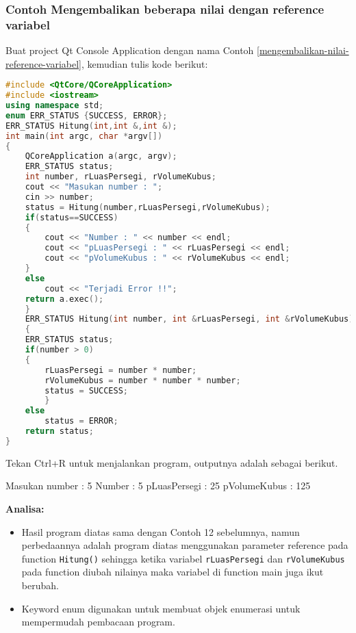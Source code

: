 \subsubsection*{Contoh  Mengembalikan beberapa nilai dengan reference variabel}

Buat project Qt Console Application dengan nama Contoh \ref{mengembalikan-nilai-reference-variabel}, kemudian
tulis kode berikut:

\begin{lstlisting}[language=c++, caption=Mengembalikan beberapa nilai dengan reference variabel, label=mengembalikan-nilai-reference-variabel]
#include <QtCore/QCoreApplication>
#include <iostream>
using namespace std;
enum ERR_STATUS {SUCCESS, ERROR};
ERR_STATUS Hitung(int,int &,int &);
int main(int argc, char *argv[])
{
    QCoreApplication a(argc, argv);
    ERR_STATUS status;
    int number, rLuasPersegi, rVolumeKubus;
    cout << "Masukan number : ";
    cin >> number;
    status = Hitung(number,rLuasPersegi,rVolumeKubus);
    if(status==SUCCESS)
    {
        cout << "Number : " << number << endl;
        cout << "pLuasPersegi : " << rLuasPersegi << endl;
        cout << "pVolumeKubus : " << rVolumeKubus << endl;
    }
    else
        cout << "Terjadi Error !!";
    return a.exec();
    }
    ERR_STATUS Hitung(int number, int &rLuasPersegi, int &rVolumeKubus)
    {
    ERR_STATUS status;
    if(number > 0)
    {
        rLuasPersegi = number * number;
        rVolumeKubus = number * number * number;
        status = SUCCESS;
        }
    else
        status = ERROR;
    return status;
}
\end{lstlisting}

Tekan Ctrl+R untuk menjalankan program, outputnya adalah sebagai
berikut.

\begin{lcverbatim}
Masukan number : 5
Number : 5
pLuasPersegi : 25
pVolumeKubus : 125
\end{lcverbatim}

\textbf{Analisa:}

\begin{itemize}

\item
  Hasil program diatas sama dengan Contoh 12 sebelumnya, namun
  perbedaannya adalah program diatas menggunakan parameter reference
  pada function \texttt{Hitung()} sehingga ketika variabel
  \texttt{rLuasPersegi} dan \texttt{rVolumeKubus} pada function diubah
  nilainya maka variabel di function main juga ikut berubah.
\item
  Keyword enum digunakan untuk membuat objek enumerasi untuk mempermudah
  pembacaan program.
\end{itemize}

